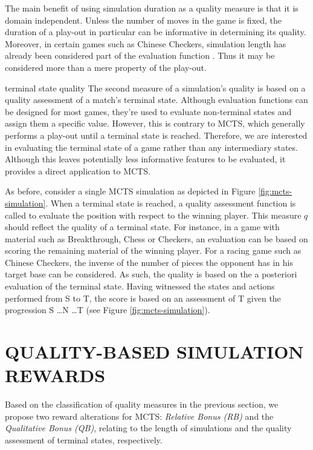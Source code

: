 \documentclass{ecai2014}
\newcommand{\node}[1]{{\fontfamily{phv}\selectfont#1}}
\begin{document}
The main benefit of using simulation duration as a quality measure is that it is domain independent. Unless the number of moves in the game is fixed, the duration of a play-out in particular can be informative in determining its quality. Moreover, in certain games such as Chinese Checkers, simulation length has already been considered part of the evaluation function \cite{roschke2013cc}. Thus it may be considered more than a mere property of the play-out.

{\sc terminal state quality} The second measure of a simulation's quality is based on a quality assessment of a match's terminal state. Although evaluation functions can be designed for most games, they're used to evaluate non-terminal states and assign them a specific value. However, this is contrary to MCTS, which generally performs a play-out until a terminal state is reached. Therefore, we are interested in evaluating the terminal state of a game rather than any intermediary states. Although this leaves potentially less informative features to be evaluated, it provides a direct application to MCTS.

As before, consider a single MCTS simulation as depicted in Figure \ref{fig:mcts-simulation}. When a terminal state is reached, a quality assessment function is called to evaluate the position with respect to the winning player. This measure $q$ should reflect the quality of a terminal state. For instance, in a game with material such as Breakthrough, Chess or Checkers, an evaluation can be based on scoring the remaining material of the winning player. For a racing game such as Chinese Checkers, the inverse of the number of pieces the opponent has in his target base can be considered. As such, the quality is based on the a posteriori evaluation of the terminal state. Having witnessed the states and actions performed from \node{S} to \node{T}, the score is based on an assessment of \node{T} given the progression \node{S} \ldots \node{N} \ldots \node{T} (see Figure \ref{fig:mcts-simulation}).

\section{QUALITY-BASED SIMULATION REWARDS}
\label{sec:qoreward}
Based on the classification of quality measures in the previous section, we propose two reward alterations for MCTS: \emph{Relative Bonus (RB)} and the \emph{Qualitative Bonus (QB)}, relating to the length of simulations and the quality assessment of terminal states, respectively. 
\end{document}

